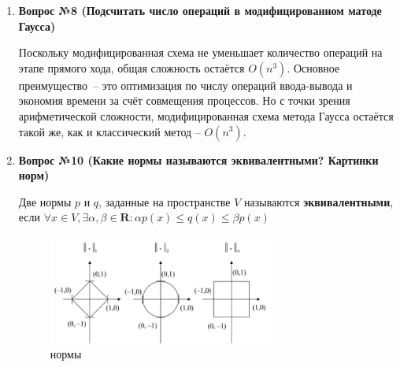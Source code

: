 \documentclass[12pt, a4paper]{article}
\begin{document}
\begin{enumerate}
		\item \textbf{Вопрос №8 (Подсчитать число операций в модифицированном матоде Гаусса)}
		
		Поскольку модифицированная схема не уменьшает количество операций на этапе прямого хода, общая сложность остаётся $O(n^3)$. Основное преимущество~-- это оптимизация по числу операций ввода-вывода и экономия времени за счёт совмещения процессов. Но с точки зрения арифметической сложности, модифицированная схема метода Гаусса остаётся такой же, как и классический метод -- $O(n^3)$.
		
		\item \textbf{Вопрос №10 (Какие нормы называются эквивалентными? Картинки норм)}
		
			Две нормы $p$ и $q$, заданные на пространстве $V$ называются \textbf{эквивалентными}, если 
		$\forall x \in V, \exists \alpha,\beta \in \mathbf{R}: \alpha p(x) \le q(x) \le \beta p(x)$
		
		\begin{figure}[!h]
			\center
			\includegraphics[width=0.7\textwidth]{pic1}
			\caption{нормы}
			\label{pic1}
		\end{figure}		
		
	\end{enumerate}
	
	
\end{document}
